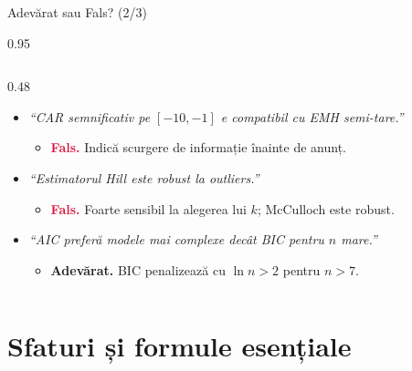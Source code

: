 \documentclass[9pt, aspectratio=169, t]{beamer}
\begin{document}
\begin{frame}[shrink=25]{Adevărat sau Fals? (2/3)}
\begin{cminipage}{0.95\textwidth}
\begin{columns}[T]
\begin{column}{0.48\textwidth}
\begin{itemize}
    \item \textit{``CAR semnificativ pe $[-10, -1]$ e compatibil cu EMH semi-tare.''}
    \begin{itemize}\setlength{\itemsep}{0pt}
        \item[] \textcolor{Crimson}{\textbf{Fals.}} Indică scurgere de informație înainte de anunț.
    \end{itemize}
    \item \textit{``Estimatorul Hill este robust la outliers.''}
    \begin{itemize}\setlength{\itemsep}{0pt}
        \item[] \textcolor{Crimson}{\textbf{Fals.}} Foarte sensibil la alegerea lui $k$; McCulloch este robust.
    \end{itemize}
    \item \textit{``AIC preferă modele mai complexe decât BIC pentru $n$ mare.''}
    \begin{itemize}\setlength{\itemsep}{0pt}
        \item[] \textcolor{Forest}{\textbf{Adevărat.}} BIC penalizează cu $\ln n > 2$ pentru $n > 7$.
    \end{itemize}
\end{itemize}
\end{column}
\end{columns}
\end{cminipage}
\end{frame}

\section{Sfaturi și formule esențiale}
\end{document}
